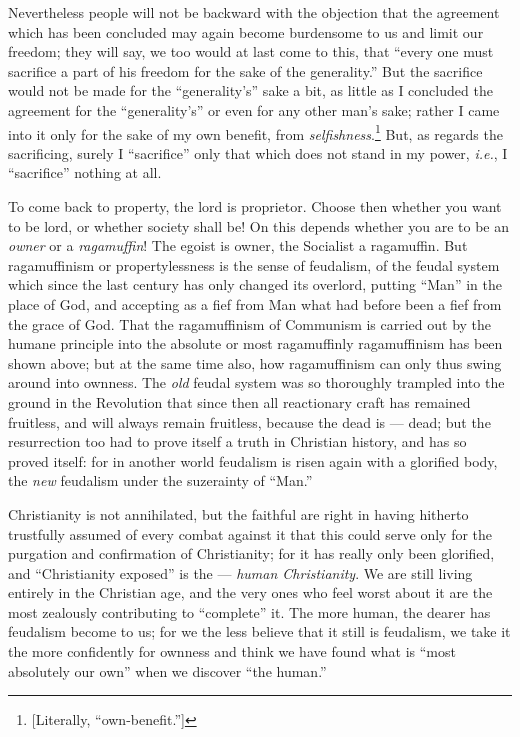 Nevertheless people will not be backward with the objection that the agreement 
which has been concluded may again become burdensome to us and limit our 
freedom; they will say, we too would at last come to this, that ``every one 
must sacrifice a part of his freedom for the sake of the generality.'' But 
the sacrifice would not be made for the ``generality's'' sake a bit, as 
little as I concluded the agreement for the ``generality's'' or even for any 
other man's sake; rather I came into it only for the sake of my own benefit, 
from \textit{selfishness}.\footnote{[Literally, ``own-benefit.'']} But, as 
regards the sacrificing, surely I ``sacrifice'' only that which does not 
stand in my power, \textit{i.e.}, I ``sacrifice'' nothing at all.

To come back to property, the lord is proprietor. Choose then whether you want 
to be lord, or whether society shall be! On this depends whether you are to be 
an \textit{owner} or a \textit{ragamuffin}! The egoist is owner, the Socialist 
a ragamuffin. But ragamuffinism or propertylessness is the sense of feudalism, 
of the feudal system which since the last century has only changed its 
overlord, putting ``Man'' in the place of God, and accepting as a fief from 
Man what had before been a fief from the grace of God. That the ragamuffinism 
of Communism is carried out by the humane principle into the absolute or most 
ragamuffinly ragamuffinism has been shown above; but at the same time also, 
how ragamuffinism can only thus swing around into ownness. The \textit{old} 
feudal system was so thoroughly trampled into the ground in the Revolution 
that since then all reactionary craft has remained fruitless, and will always 
remain fruitless, because the dead is --- dead; but the resurrection too had to 
prove itself a truth in Christian history, and has so proved itself: for in 
another world feudalism is risen again with a glorified body, the \textit{new} 
feudalism under the suzerainty of ``Man.''

Christianity is not annihilated, but the faithful are right in having hitherto 
trustfully assumed of every combat against it that this could serve only for 
the purgation and confirmation of Christianity; for it has really only been 
glorified, and ``Christianity exposed'' is the --- \textit{human 
Christianity}. We are still living entirely in the Christian age, and the very 
ones who feel worst about it are the most zealously contributing to 
``complete'' it. The more human, the dearer has feudalism become to us; for 
we the less believe that it still is feudalism, we take it the more 
confidently for ownness and think we have found what is ``most absolutely our 
own'' when we discover ``the human.''

